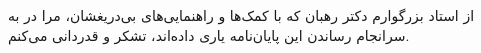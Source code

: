 


\begin{center}
    \end{center}
    
    از استاد بزرگوارم دکتر رهبان که با کمک‌ها و راهنمایی‌های بی‌دریغشان، مرا
    در به سرانجام رساندن این پایان‌نامه یاری داده‌اند، تشکر و قدردانی می‌کنم.
    
    